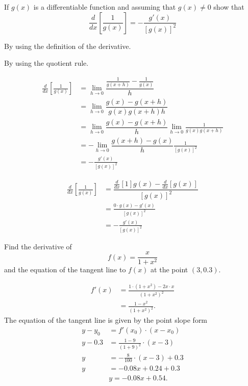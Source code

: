 \documentclass[unboxed]{hwset}
\begin{document}
\begin{problem}[1.]
	If $g(x)$ is a differentiable function and assuming that $g(x) \ne 0$ show
	that
	\begin{equation*}
		\frac{d}{dx}\left[\frac{1}{g(x)}\right] = -\frac{g'(x)}{[g(x)]^2}
	\end{equation*}
	\be
	\item By using the definition of the derivative.
	\item By using the quotient rule.
	\ee
\end{problem}

\be
	\item
	\begin{solution}
		\begin{align*}
			\frac{d}{dx}\left[\frac{1}{g(x)}\right] &= \lim_{h\to 0}
				\dfrac{\frac{1}{g(x+h)} - \frac{1}{g(x)}}{h}\\
			&=\lim_{h\to 0} \dfrac{g(x) - g(x+h)}{g(x)g(x+h)h}\\
			&=\lim_{h\to 0} \dfrac{g(x) - g(x+h)}{h} \lim_{h\to 0} \frac{1}{g(x)g(x+h)}\\
			&=-\lim_{h\to 0} \dfrac{g(x+h) - g(x)}{h} \frac{1}{[g(x)]^2}\\
			&=-\frac{g'(x)}{[g(x)]^2}
		\end{align*}
	\end{solution}
	\item
	\begin{solution}
		\begin{align*}
			\frac{d}{dx}\left[\frac{1}{g(x)}\right] &= \dfrac{\frac{d}{dx}[1]g(x) -
				\frac{d}{dx}[g(x)]}{[g(x)]^2} \\ 
			&=\frac{0\cdot g(x)-g'(x)}{[g(x)]^2} \\ 
			&=-\frac{g'(x)}{[g(x)]^2} 
		\end{align*}
	\end{solution}
\ee

\begin{problem}[2.]
	Find the derivative of 
	\begin{equation*}
		f(x) = \frac{x}{1+x^2}
	\end{equation*}
	and the equation of the tangent line to $f(x)$ at the point $(3,0.3)$.
\end{problem}

\begin{solution}
	\begin{align*}
		f'(x) &= \frac{1\cdot(1+x^2) - 2x\cdot x}{(1+x^2)^2} \\
		&= \boxed{\frac{1-x^2}{(1+x^2)^2}.}
	\end{align*}
	The equation of the tangent line is given by the point slope form
	\begin{align*}
		y - y_0 &= f'(x_0)\cdot (x - x_0) \\ 
		y - 0.3 &= \frac{1-9}{(1+9)^2}\cdot (x - 3) \\ 
		y &= -\frac{8}{100}\cdot (x - 3) + 0.3\\ 
		y &= -0.08 x + 0.24 + 0.3\\ 
		&\boxed{y = -0.08 x + 0.54.} 
	\end{align*}
\end{solution}
\end{document}
